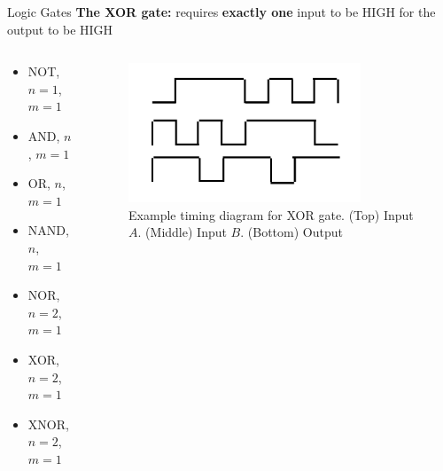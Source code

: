 \documentclass{beamer}
\begin{document}
\begin{frame}{Logic Gates}
\textbf{The XOR gate:} requires \textbf{exactly one} input to be HIGH for the output to be HIGH \\ \vspace{0.5cm}
\begin{columns}[T]
\begin{column}{0.5\textwidth}
\begin{itemize}
\item \alert{NOT, $n=1$, $m=1$}
\item \alert{AND, $n$, $m=1$}
\item \alert{OR, $n$, $m=1$}
\item \alert{NAND, $n$, $m=1$}
\item \alert{NOR, $n=2$, $m=1$}
\item \alert{XOR, $n=2$, $m=1$}
\item XNOR, $n=2$, $m=1$
\end{itemize}
\end{column}
\begin{column}{0.5\textwidth}
\begin{figure}
\centering
\includegraphics[width=0.8\textwidth]{figures/TimingXor.pdf}
\caption{\label{fig:xor2} Example timing diagram for XOR gate.  (Top) Input $A$.  (Middle) Input $B$. (Bottom) Output}
\end{figure}
\end{column}
\end{columns}
\end{frame}
\end{document}
